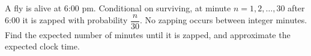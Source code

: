 A fly is alive at 6:00 pm. Conditional on surviving, at minute $n=1,2,\ldots,30$ after 6:00 it is zapped with probability $\dfrac{n}{30}$. No zapping occurs between integer minutes. Find the expected number of minutes until it is zapped, and approximate the expected clock time.
